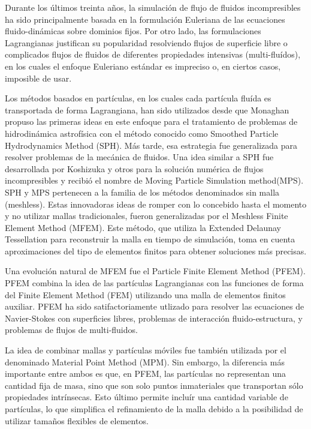 \documentclass[a4paper,conference]{IEEEtran}
\begin{document}
Durante los últimos treinta años, la simulación de flujo de fluidos incompresibles ha sido principalmente basada en la formulación Euleriana de las ecuaciones fluido-dinámicas sobre dominios fijos\cite{Donea03}. Por otro lado, las formulaciones Lagrangianas justifican su popularidad resolviendo flujos de superficie libre o complicados flujos de fluidos de diferentes propiedades intensivas (multi-fluídos), en los cuales el enfoque Euleriano estándar es impreciso o, en ciertos casos, imposible de usar.

Los métodos basados en partículas, en los cuales cada partícula fluída es transportada de forma Lagrangiana, han sido utilizados desde que Monaghan\cite{Mon77} propuso las primeras ideas en este enfoque para el tratamiento de problemas de hidrodinámica astrofísica con el método conocido como Smoothed Particle Hydrodynamics Method (SPH). Más tarde, esa estrategia fue generalizada para resolver problemas de la mecánica de fluidos\cite{Monaghan88}. Una idea similar a SPH fue desarrollada por Koshizuka y otros\cite{Koshizuka95} para la solución numérica de flujos incompresibles y recibió el nombre de Moving Particle Simulation method(MPS). SPH y MPS pertenecen a la familia de los métodos denominados sin malla (meshless). Estas innovadoras ideas de romper con lo concebido hasta el momento y no utilizar mallas tradicionales, fueron generalizadas por el Meshless Finite Element Method (MFEM)\cite{Ide03b}. Este método, que utiliza la Extended Delaunay Tessellation\cite{Ide03} para reconstruir la malla en tiempo de 
simulación, toma en cuenta aproximaciones del tipo de elementos finitos para obtener soluciones más precisas.

Una evolución natural de MFEM fue el Particle Finite Element Method (PFEM)\cite{Idelsohn04}. PFEM combina la idea de las partículas Lagrangianas con las funciones de forma del Finite Element Method (FEM) utilizando una malla de elementos finitos auxiliar. PFEM ha sido satifactoriamente utlizado para resolver las ecuaciones de Navier-Stokes con superficies libres\cite{Aubry05}\cite{Idelsohn02}\cite{Larese08}, problemas de interacción fluido-estructura\cite{Idelsohn06}, y problemas de flujos de multi-fluidos\cite{Idelsohn09}. 

La idea de combinar mallas y partículas móviles fue también utilizada por el denominado Material Point Method (MPM)\cite{Wieckowsky04}.  Sin embargo, la diferencia más importante entre ambos es que, en PFEM, las partículas no representan una cantidad fija de masa, sino que son solo puntos inmateriales que transportan sólo propiedades intrínsecas. Esto último permite incluír una cantidad variable de partículas, lo que simplifica el refinamiento de la malla debido a la posibilidad de utilizar tamaños flexibles de elementos.
\end{document}
